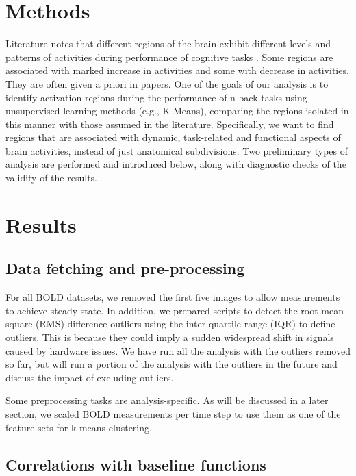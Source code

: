 \documentclass[11pt]{article}
\begin{document}
\section{Methods}

Literature notes that different regions of the brain exhibit different levels
and patterns of activities during performance of cognitive tasks
\cite{fox2005}. Some regions are associated with marked increase in
activities and some with decrease in activities. They are often given a priori
in papers. One of the goals of our analysis is to identify activation regions
during the performance of n-back tasks using unsupervised learning methods
(e.g., K-Means), comparing the regions isolated in this manner with those
assumed in the literature. Specifically, we want to find regions that are
associated with dynamic, task-related and functional aspects of brain
activities, instead of just anatomical subdivisions. Two preliminary types of
analysis are performed and introduced below, along with diagnostic checks of the
validity of the results. 

\section{Results}

\subsection{Data fetching and pre-processing}

For all BOLD datasets, we removed the first five images to allow measurements to
achieve steady state. In addition, we prepared scripts to detect the root mean
square (RMS) difference outliers using the inter-quartile range (IQR) to define
outliers. This is because they could imply a sudden widespread shift in signals
caused by hardware issues. We have run all the analysis with the outliers
removed so far, but will run a portion of the analysis with the outliers in the
future and discuss the impact of excluding outliers. 

Some preprocessing tasks are analysis-specific. As will be discussed in a later
section, we scaled BOLD measurements per time step to use them as one of the
feature sets for k-means clustering. 

\subsection{Correlations with baseline functions}
\end{document}
